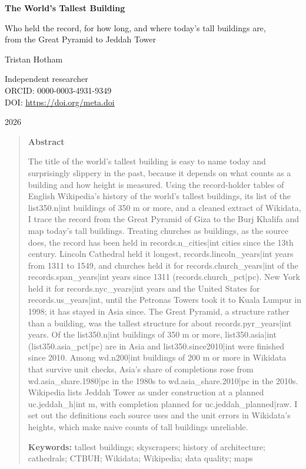 \documentclass[11pt,a4paper]{article}
\begin{document}
\begin{center}
{\Large\bfseries The World's Tallest Building\par}
\vspace{0.4em}
{\large Who held the record, for how long, and where today's tall buildings are,\\from the Great Pyramid to Jeddah Tower\par}
\vspace{1.2em}
{\large Tristan Hotham\par}
\vspace{0.3em}
{\small Independent researcher\\
ORCID: 0000-0003-4931-9349\\
DOI: \href{https://doi.org/{{meta.doi}}}{https://doi.org/{{meta.doi}}}\par}
\vspace{0.8em}
2026
\end{center}

\begin{quote}
\small
\begin{center}\textbf{Abstract}\end{center}
The title of the world's tallest building is easy to name today and surprisingly slippery in the past, because it depends on what counts as a building and how height is measured. Using the record-holder tables of English Wikipedia's history of the world's tallest buildings, its list of the {{list350.n|int}} buildings of 350 m or more, and a cleaned extract of Wikidata, I trace the record from the Great Pyramid of Giza to the Burj Khalifa and map today's tall buildings. Treating churches as buildings, as the source does, the record has been held in {{records.n_cities|int}} cities since the 13th century. Lincoln Cathedral held it longest, {{records.lincoln_years|int}} years from 1311 to 1549, and churches held it for {{records.church_years|int}} of the {{records.span_years|int}} years since 1311 ({{records.church_pct|pc}}). New York held it for {{records.nyc_years|int}} years and the United States for {{records.us_years|int}}, until the Petronas Towers took it to Kuala Lumpur in 1998; it has stayed in Asia since. The Great Pyramid, a structure rather than a building, was the tallest structure for about {{records.pyr_years|int}} years. Of the {{list350.n|int}} buildings of 350 m or more, {{list350.asia|int}} ({{list350.asia_pct|pc}}) are in Asia and {{list350.since2010|int}} were finished since 2010. Among {{wd.n200|int}} buildings of 200 m or more in Wikidata that survive unit checks, Asia's share of completions rose from {{wd.asia_share.1980|pc}} in the 1980s to {{wd.asia_share.2010|pc}} in the 2010s. Wikipedia lists Jeddah Tower as under construction at a planned {{uc.jeddah_h|int}} m, with completion planned for {{uc.jeddah_planned|raw}}. I set out the definitions each source uses and the unit errors in Wikidata's heights, which make naive counts of tall buildings unreliable.

\textbf{Keywords:} tallest buildings; skyscrapers; history of architecture; cathedrals; CTBUH; Wikidata; Wikipedia; data quality; maps
\end{quote}
\end{document}
